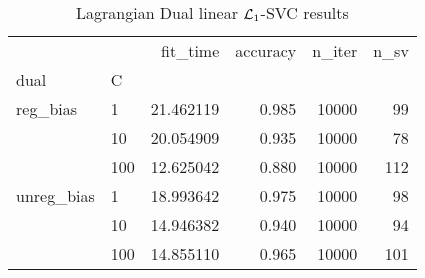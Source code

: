 \begin{table}[H]
\centering
\caption{Lagrangian Dual linear $\protect \mathcal{L}_1$-SVC results}
\label{linear_lagrangian_dual_l1_svc_cv_results}
\begin{tabular}{llrrrr}
\toprule
           &     &   fit\_time &  accuracy &  n\_iter &  n\_sv \\
dual & C &            &           &         &       \\
\midrule
reg\_bias & 1   &  21.462119 &     0.985 &   10000 &    99 \\
           & 10  &  20.054909 &     0.935 &   10000 &    78 \\
           & 100 &  12.625042 &     0.880 &   10000 &   112 \\
unreg\_bias & 1   &  18.993642 &     0.975 &   10000 &    98 \\
           & 10  &  14.946382 &     0.940 &   10000 &    94 \\
           & 100 &  14.855110 &     0.965 &   10000 &   101 \\
\bottomrule
\end{tabular}
\end{table}
